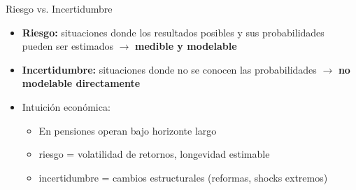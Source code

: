 \documentclass{beamer}
\begin{document}
\begin{frame}{Riesgo vs. Incertidumbre}

\begin{itemize}

      \item \textbf{Riesgo:} situaciones donde los resultados posibles y sus probabilidades pueden ser estimados $\rightarrow$ \textbf{medible y modelable}
      \vspace{0.2cm}
      \item \textbf{Incertidumbre:} situaciones donde no se conocen las probabilidades $\rightarrow$ \textbf{no modelable directamente}
      \vspace{0.2cm}
      \item Intuición económica:      
         \begin{itemize}
            \item En pensiones operan bajo horizonte largo
            \vspace{0.2cm}
            \item riesgo = volatilidad de retornos, longevidad estimable
            \vspace{0.2cm}
            \item incertidumbre = cambios estructurales (reformas, shocks extremos)
        \end{itemize}
\end{itemize}
  
\end{frame}
\end{document}
